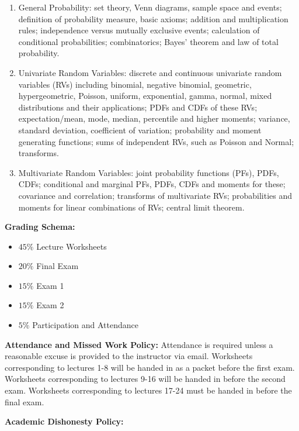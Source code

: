 \documentclass[11pt,reqno]{amsproc}
\begin{document}
\begin{enumerate}
	\item General Probability: set theory, Venn diagrams, sample space and events; definition of probability measure, basic axioms; addition and multiplication rules; independence versus mutually exclusive events; calculation of conditional probabilities; combinatorics; Bayes' theorem and law of total probability.
	\item Univariate Random Variables: discrete and continuous univariate random variables (RVs) including binomial, negative binomial, geometric, hypergeometric, Poisson, uniform, exponential, gamma, normal, mixed distributions and their applications; PDFs and CDFs of these RVs; expectation/mean, mode, median, percentile and higher moments; variance, standard deviation, coefficient of variation; probability and moment generating functions; sums of independent RVs, such as Poisson and Normal; transforms.
	\item  Multivariate Random Variables: joint probability functions (PFs), PDFs, CDFs; conditional and marginal PFs, PDFs, CDFs and moments for these; covariance and correlation; transforms of multivariate RVs; probabilities and moments for linear combinations of RVs; central limit theorem.
\end{enumerate}

\noindent\textbf{Grading Schema:}

\begin{itemize}
	\item $45 \%$ Lecture Worksheets
	\item $20 \%$ Final Exam
	\item $15 \%$ Exam 1
	\item $15 \%$ Exam 2
  \item $5\%$ Participation and Attendance
\end{itemize}

\noindent\textbf{Attendance and Missed Work Policy:}
Attendance is required unless a reasonable excuse is provided to the instructor via email. Worksheets corresponding to lectures 1-8 will be handed in as a packet before the first exam. Worksheets corresponding to lectures 9-16 will be handed in before the second exam. Worksheets corresponding to lectures 17-24 must be handed in before the final exam.

\noindent\textbf{Academic Dishonesty Policy:}

\begin{center}
\end{center}
\end{document}
